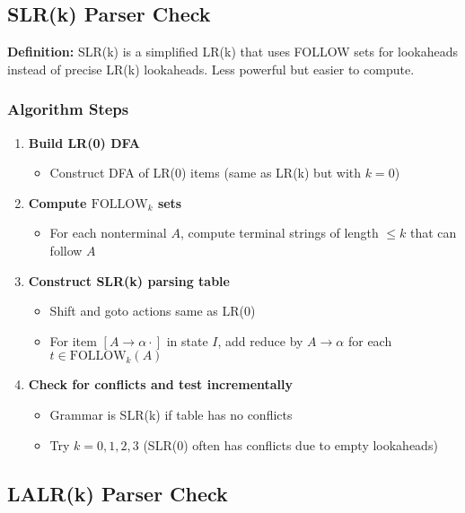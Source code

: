 \subsection{SLR(k) Parser Check}

\textbf{Definition:} SLR(k) is a simplified LR(k) that uses FOLLOW sets for lookaheads instead of precise LR(k) lookaheads. Less powerful but easier to compute.

\subsubsection{Algorithm Steps}

\begin{enumerate}
    \item \textbf{Build LR(0) DFA}
    \begin{itemize}
        \item Construct DFA of LR(0) items (same as LR(k) but with $k = 0$)
    \end{itemize}
    
    \item \textbf{Compute $\text{FOLLOW}_k$ sets}
    \begin{itemize}
        \item For each nonterminal $A$, compute terminal strings of length $\leq k$ that can follow $A$
    \end{itemize}
    
    \item \textbf{Construct SLR(k) parsing table}
    \begin{itemize}
        \item Shift and goto actions same as LR(0)
        \item For item $[A \to \alpha \cdot]$ in state $I$, add reduce by $A \to \alpha$ for each $t \in \text{FOLLOW}_k(A)$
    \end{itemize}
    
    \item \textbf{Check for conflicts and test incrementally}
    \begin{itemize}
        \item Grammar is SLR(k) if table has no conflicts
        \item Try $k = 0, 1, 2, 3$ (SLR(0) often has conflicts due to empty lookaheads)
    \end{itemize}
\end{enumerate}

\subsection{LALR(k) Parser Check}

